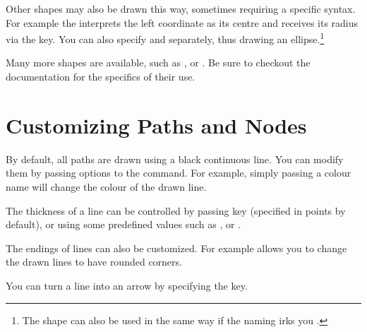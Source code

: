Other shapes may also be drawn this way, sometimes requiring a specific syntax.
For example the  interprets the left coordinate as its centre and
receives its radius via the  key. You can also specify  and  separately, thus drawing an ellipse.\footnote{The
   shape can also be used in the same way if the naming irks you
  \smiley.}
\begin{example}[vertical_mode, examplewidth=0.9\linewidth]
\end{example}
Many more shapes are available, such as ,  or .
Be sure to checkout the documentation for the specifics of their use.

\section{Customizing Paths and Nodes}

By default, all paths are drawn using a black continuous line. You can modify
them by passing options to the  command. For example, simply passing
a colour name will change the colour of the drawn line.
\begin{example}
\end{example}

The thickness of a line can be controlled by passing  key
(specified in points by default), or using some predefined values such as
,  or .
\begin{example}
\end{example}

The endings of lines can also be customized. For
example  allows you to change the drawn lines to have rounded
corners.
\begin{example}
\end{example}
You can turn a line into an arrow by specifying the  key.
\begin{example}
\end{example}

